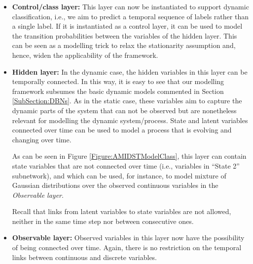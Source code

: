\begin{itemize}

\item \textbf{Control/class layer:} This layer can now be instantiated to support dynamic classification, i.e., we aim to predict a temporal sequence of labels rather than a single label. If it is instantiated as a control layer, it can be used to model the transition probabilities between the variables of the hidden layer. This can be seen as a modelling trick to relax the stationarity assumption and, hence, widen the applicability of the framework.

\item \textbf{Hidden layer:}  In the dynamic case, the hidden variables in this layer can be temporally connected. In
  this way, it is easy to see that our modelling framework subsumes the basic dynamic models commented in Section
  \ref{SubSection:DBNs}. As in the static case, these variables aim to capture the dynamic parts of the system that can
  not be observed but are nonetheless relevant for modelling the dynamic system/process. State and latent variables connected over time can be used to model a process that is evolving and changing over time.

As can be seen in Figure \ref{Figure:AMIDSTModelClass}, this layer can contain state variables that are not connected
over time (i.e., variables in ``State 2'' subnetwork), and which can be used, for instance, to model mixture of Gaussian distributions over the observed continuous variables in the \textit{Observable layer}. 

Recall that links from latent variables to state variables are not allowed, neither in the same time step nor between consecutive ones.

\item \textbf{Observable layer:}  Observed variables in this layer now have the possibility of being connected over time. Again, there is no restriction on the temporal links between continuous and discrete variables. 

\end{itemize} 



